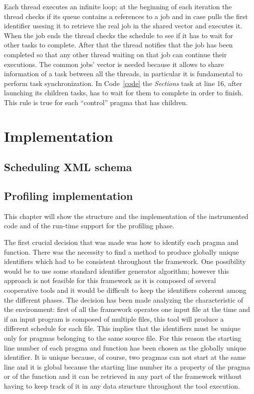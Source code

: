 \documentclass[a4paper,11pt,oneside]{book}
\begin{document}
Each thread executes an infinite loop; at the beginning of each iteration the thread checks if its queue contains a references to a job and in case pulls the first identifier usesing it to retrieve the real job in the shared vector and executes it. When the job ends the thread checks the schedule to see if it has to wait for other tasks to complete. After that the thread notifies that the job has been completed so that any other thread waiting on that job can continue their executions. The common jobs’ vector is needed because it allows to share information of a task between all the threads, in particular it is fundamental to perform task synchronization. In Code~\ref{code} the \emph{Sections} task at line 16, after launching its children tasks, has to wait for them to complete in order to finish. This rule is true for each “control” pragma that has children. 


\chapter{Implementation}
\section{Scheduling XML schema}
\section{Profiling implementation}
This chapter will show the structure and the implementation of the instrumented code and of the run-time support for the profiling phase.

The first crucial decision that was made was how to identify each pragma and function. There was the necessity to find a method to produce globally unique identifiers which had to be consistent throughout the framework. One possibility would be to use some standard identifier generator algorithm; however this approach is not feasible for this framework as it is composed of several cooperative tools and it would be difficult to keep the identifiers coherent among the different phases. The decision has been made analyzing the characteristic of the environment: first of all the framework operates one input file at the time and if an input program is composed of multiple files, this tool will produce a different schedule for each file. This implies that the identifiers must be unique only for pragmas belonging to the same source file. For this reason the starting line number of each pragma and function has been chosen as the globally unique identifier. It is unique because, of course, two pragmas can not start at the same line and it is global because the starting line number its a property of the pragma or of the function and it can be retrieved in any part of the framework without having to keep track of it in any data structure throughout the tool execution.
\end{document}
